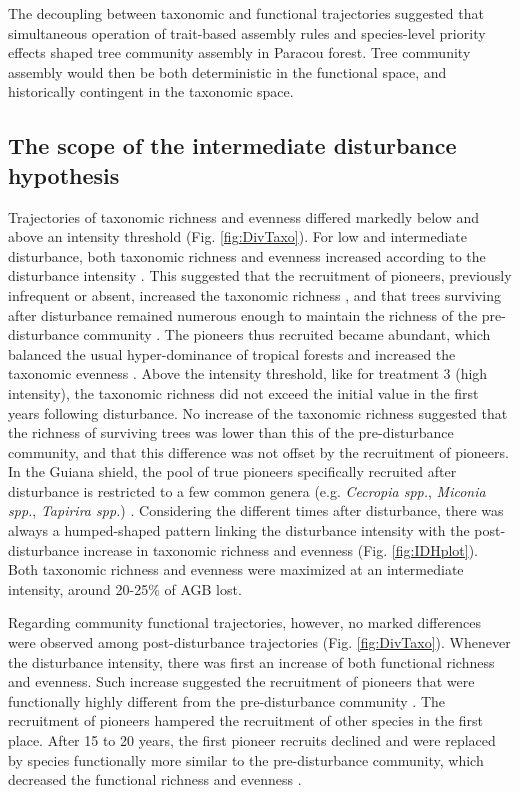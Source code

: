 \documentclass[fleqn,10pt]{ArtEcoFoG} %
\theoremstyle{definition}
\theoremstyle{definition}
\theoremstyle{definition}
\theoremstyle{remark}
\begin{document}
The decoupling between taxonomic and functional trajectories suggested
that simultaneous operation of trait-based assembly rules and
species-level priority effects shaped tree community assembly in Paracou
forest. Tree community assembly would then be both deterministic in the
functional space, and historically contingent in the taxonomic space.

\subsection{The scope of the intermediate disturbance
hypothesis}\label{the-scope-of-the-intermediate-disturbance-hypothesis}

Trajectories of taxonomic richness and evenness differed markedly below
and above an intensity threshold (Fig. \ref{fig:DivTaxo}). For low and
intermediate disturbance, both taxonomic richness and evenness increased
according to the disturbance intensity
\citep{Martin2015, Chaudhary2016}. This suggested that the recruitment
of pioneers, previously infrequent or absent, increased the taxonomic
richness \citep{Martin2015, Chaudhary2016}, and that trees surviving
after disturbance remained numerous enough to maintain the richness of
the pre-disturbance community \citep{Bongers2009}. The pioneers thus
recruited became abundant, which balanced the usual hyper-dominance of
tropical forests and increased the taxonomic evenness
\citep{Baraloto2012a}. Above the intensity threshold, like for treatment
3 (high intensity), the taxonomic richness did not exceed the initial
value in the first years following disturbance. No increase of the
taxonomic richness suggested that the richness of surviving trees was
lower than this of the pre-disturbance community, and that this
difference was not offset by the recruitment of pioneers. In the Guiana
shield, the pool of true pioneers specifically recruited after
disturbance is restricted to a few common genera (e.g. \emph{Cecropia
spp.}, \emph{Miconia spp.}, \emph{Tapirira spp.}) \citep{Guitet2018}.
Considering the different times after disturbance, there was always a
humped-shaped pattern linking the disturbance intensity with the
post-disturbance increase in taxonomic richness and evenness (Fig.
\ref{fig:IDHplot}). Both taxonomic richness and evenness were maximized
at an intermediate intensity, around 20-25\% of AGB lost.

Regarding community functional trajectories, however, no marked
differences were observed among post-disturbance trajectories (Fig.
\ref{fig:DivTaxo}). Whenever the disturbance intensity, there was first
an increase of both functional richness and evenness. Such increase
suggested the recruitment of pioneers that were functionally highly
different from the pre-disturbance community
\citep{Denslow1980, Molino2001}. The recruitment of pioneers hampered
the recruitment of other species in the first place. After 15 to 20
years, the first pioneer recruits declined and were replaced by species
functionally more similar to the pre-disturbance community, which
decreased the functional richness and evenness \citep{Walker2009}.
\end{document}
